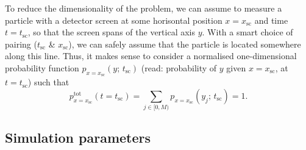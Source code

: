     To reduce the dimensionality of the problem, we can assume to measure a particle with a detector screen at some horisontal position $x=x_\mathrm{sc}$ and time $t=t_\mathrm{sc}$, so that the screen spans of the vertical axis $y$. With a smart choice of pairing ($t_\mathrm{sc}$ \& $x_\mathrm{sc}$), we can safely assume that the particle is located somewhere along this line. Thus, it makes sense to consider a normalised one-dimensional probability function $p_{x=x_\mathrm{sc}}(y;\, t_\mathrm{sc})$ (read: probability of $y$ given $x=x_\mathrm{sc}$, at $t=t_\mathrm{sc}$) such that
    \begin{equation}\label{eq:tot_probability_along_y}
        p^\mathrm{tot}_{x=x_\mathrm{sc}}(t\!=\!t_\mathrm{sc}) =\sum_{j\in [0, M)} p_{x=x_\mathrm{sc}}(y_j;\, t_\mathrm{sc}) = 1.
    \end{equation}



\subsection{Simulation parameters}\label{sec:method:simulation_parameters}

